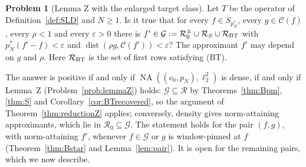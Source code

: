 \documentclass[10pt]{amsart}
\theoremstyle{definition}
\newtheorem{problem}[theorem]{Problem}
\theoremstyle{remark}
\newcommand{\NA}{\operatorname{NA}}
\newcommand{\dist}{\operatorname{dist}}
\newcommand{\Cset}{\mathcal C}
\newcommand{\Rec}{\mathcal R}
\begin{document}
\begin{problem}[Lemma Z with the enlarged target class]\label{prob:lemmaZper}
Let $T$ be the operator of Definition~\ref{def:SLD} and $N\ge1$.  Is it
true that for every $f\in S_{p_N^*}$, every $g\in\Cset(f)$, every $\rho<1$
and every $\varepsilon>0$ there is $f'\in\mathcal G:=\mathcal R_0^\pm\cup
\mathcal R_S\cup\mathcal R_{\rm BT}$ with $p_N^*(f'-f)<\varepsilon$ and
$\dist(\rho g,\Cset(f'))<\varepsilon$?  The approximant $f'$ may depend on
$g$ and $\rho$.  Here $\mathcal R_{\rm BT}$ is the set of first rows
satisfying \textup{(BT)}.
\end{problem}

The answer is positive if and only if $\NA((c_0,p_N),\ell_2^2)$ is dense,
if and only if Lemma~Z (Problem~\ref{prob:lemmaZ}) holds: $\mathcal
G\subseteq\Rec$ by Theorems~\ref{thm:Bpm}, \ref{thm:S} and
Corollary~\ref{cor:BTrecovered}, so the argument of
Theorem~\ref{thm:reductionZ} applies; conversely, density gives
norm-attaining approximants, which lie in $\mathcal R_0\subseteq\mathcal
G$.  The statement holds for the pair $(f,g)$, with norm-attaining $f'$,
whenever $f\in\mathcal G$ or $g$ is window-pinned at $f$
(Theorem~\ref{thm:Bstar} and Lemma~\ref{lem:pair}).  It is open for the
remaining pairs, which we now describe.
\end{document}
